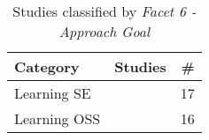 
\begin{table}[h]
	\centering
	\caption {Studies classified by \it Facet 6 - Approach Goal}
		{\begin{tabular}{l|p{2.1in}|r}
			\bf Category & \bf Studies & \bf \# \\
			\hline
			Learning SE & \citep{id17882, id0135, id5343, id5353, id5357, id4503, id4811, id4815, id5676, id17805, id17845, id5546, id17800, id0134, id0106, id5147, id5328} & 17 \\
			Learning OSS & \citep{id17796, id0093, id1088, id4663, id17830, id18433, id5329, id5335, id0089, id0115, id0098, id1097, id1192, id1193, id4966, id18359} & 16 \\
		\end{tabular}} 
        \label{tab:approachGoalStudies}
\end{table}

